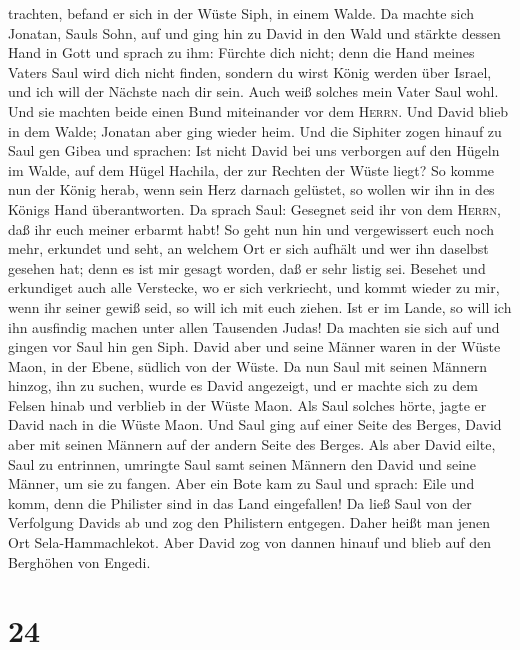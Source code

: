 trachten, befand er sich in der Wüste Siph, in einem Walde.
 Da machte sich Jonatan, Sauls Sohn, auf und ging hin zu
David in den Wald und stärkte dessen Hand in Gott  und
sprach zu ihm: Fürchte dich nicht; denn die Hand meines Vaters Saul wird
dich nicht finden, sondern du wirst König werden über Israel, und ich
will der Nächste nach dir sein. Auch weiß solches mein Vater Saul wohl.
 Und sie machten beide einen Bund miteinander vor dem
\textsc{Herrn}. Und David blieb in dem Walde; Jonatan aber ging wieder
heim.  Und die Siphiter zogen hinauf zu Saul gen Gibea
und sprachen: Ist nicht David bei uns verborgen auf den Hügeln im Walde,
auf dem Hügel Hachila, der zur Rechten der Wüste liegt? 
So komme nun der König herab, wenn sein Herz darnach gelüstet, so wollen
wir ihn in des Königs Hand überantworten.  Da sprach
Saul: Gesegnet seid ihr von dem \textsc{Herrn}, daß ihr euch meiner
erbarmt habt!  So geht nun hin und vergewissert euch noch
mehr, erkundet und seht, an welchem Ort er sich aufhält und wer ihn
daselbst gesehen hat; denn es ist mir gesagt worden, daß er sehr listig
sei.  Besehet und erkundiget auch alle Verstecke, wo er
sich verkriecht, und kommt wieder zu mir, wenn ihr seiner gewiß seid, so
will ich mit euch ziehen. Ist er im Lande, so will ich ihn ausfindig
machen unter allen Tausenden Judas!  Da machten sie sich
auf und gingen vor Saul hin gen Siph. David aber und seine Männer waren
in der Wüste Maon, in der Ebene, südlich von der Wüste. 
Da nun Saul mit seinen Männern hinzog, ihn zu suchen, wurde es David
angezeigt, und er machte sich zu dem Felsen hinab und verblieb in der
Wüste Maon. Als Saul solches hörte, jagte er David nach in die Wüste
Maon.  Und Saul ging auf einer Seite des Berges, David
aber mit seinen Männern auf der andern Seite des Berges. Als aber David
eilte, Saul zu entrinnen, umringte Saul samt seinen Männern den David
und seine Männer, um sie zu fangen.  Aber ein Bote kam zu
Saul und sprach: Eile und komm, denn die Philister sind in das Land
eingefallen!  Da ließ Saul von der Verfolgung Davids ab
und zog den Philistern entgegen. Daher heißt man jenen Ort
Sela-Hammachlekot.  Aber David zog von dannen hinauf und
blieb auf den Berghöhen von Engedi.

\hypertarget{section-23}{%
\section{24}\label{section-23}}


